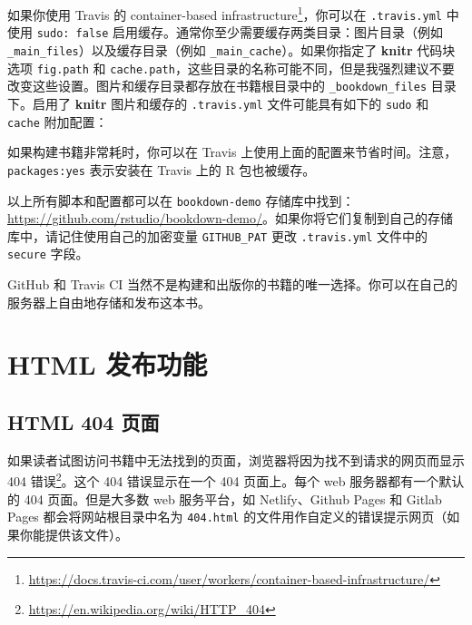 \documentclass[
  12pt,
]{krantz}
\newenvironment{Shaded}{\begin{snugshade}}{\end{snugshade}}
\newcommand{\AttributeTok}[1]{\textcolor[rgb]{0.13,0.29,0.53}{#1}}
\newcommand{\CharTok}[1]{\textcolor[rgb]{0.31,0.60,0.02}{#1}}
\newcommand{\FunctionTok}[1]{\textcolor[rgb]{0.13,0.29,0.53}{\textbf{#1}}}
\newcommand{\KeywordTok}[1]{\textcolor[rgb]{0.13,0.29,0.53}{\textbf{#1}}}
\renewcommand{\href}[2]{#2\footnote{\url{#1}}}
\theoremstyle{definition}
\theoremstyle{definition}
\theoremstyle{definition}
\theoremstyle{definition}
\theoremstyle{remark}
\begin{document}
如果你使用 Travis 的 \href{https://docs.travis-ci.com/user/workers/container-based-infrastructure/}{container-based infrastructure}，你可以在 \texttt{.travis.yml} 中使用 \texttt{sudo:\ false} 启用缓存。通常你至少需要缓存两类目录：图片目录（例如 \texttt{\_main\_files}）以及缓存目录（例如 \texttt{\_main\_cache}）。如果你指定了 \textbf{knitr} 代码块选项 \texttt{fig.path} 和 \texttt{cache.path}，这些目录的名称可能不同，但是我强烈建议不要改变这些设置。图片和缓存目录都存放在书籍根目录中的 \texttt{\_bookdown\_files} 目录下。启用了 \textbf{knitr} 图片和缓存的 \texttt{.travis.yml} 文件可能具有如下的 \texttt{sudo} 和 \texttt{cache} 附加配置：

\begin{Shaded}
\end{Shaded}

如果构建书籍非常耗时，你可以在 Travis 上使用上面的配置来节省时间。注意，\texttt{packages:yes} 表示安装在 Travis 上的 R 包也被缓存。

以上所有脚本和配置都可以在 \texttt{bookdown-demo} 存储库中找到：\url{https://github.com/rstudio/bookdown-demo/}。如果你将它们复制到自己的存储库中，请记住使用自己的加密变量 \texttt{GITHUB\_PAT} 更改 \texttt{.travis.yml} 文件中的 \texttt{secure} 字段。

GitHub 和 Travis CI 当然不是构建和出版你的书籍的唯一选择。你可以在自己的服务器上自由地存储和发布这本书。

\hypertarget{html-ux53d1ux5e03ux529fux80fd}{%
\section{HTML 发布功能}\label{html-ux53d1ux5e03ux529fux80fd}}

\hypertarget{html-404}{%
\subsection{HTML 404 页面}\label{html-404}}

如果读者试图访问书籍中无法找到的页面，浏览器将因为找不到请求的网页而显示 \href{https://en.wikipedia.org/wiki/HTTP_404}{404 错误}。这个 404 错误显示在一个 404 页面上。每个 web 服务器都有一个默认的 404 页面。但是大多数 web 服务平台，如 Netlify、Github Pages 和 Gitlab Pages 都会将网站根目录中名为 \texttt{404.html} 的文件用作自定义的错误提示网页（如果你能提供该文件）。
\end{document}
